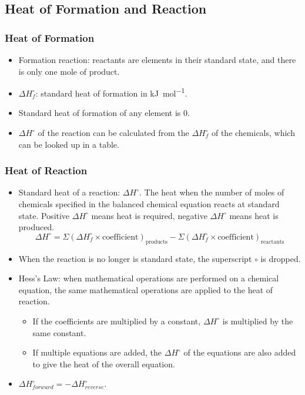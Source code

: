 \documentclass{article}
\begin{document}
\subsection{Heat of Formation and Reaction}

\subsubsection{Heat of Formation}

\begin{itemize}
    \item Formation reaction: reactants are elements in their standard state, and there is only one mole of product.
    \item $\Delta H_{f}^\circ$: standard heat of formation in \si[per-mode = fraction]{\kilo\joule\per\mole}. 
    \item Standard heat of formation of any element is $0$. 
    \item $\Delta H^\circ$ of the reaction can be calculated from the $\Delta H_{f}^\circ$ of the chemicals, which can be looked up in a table.
\end{itemize}

\subsubsection{Heat of Reaction}

\begin{itemize}
    \item Standard heat of a reaction: $\Delta H^\circ$. The heat when the number of moles of chemicals specified in the balanced chemical equation reacts at standard state. Positive $\Delta H^\circ$ means heat is required, negative $\Delta H^\circ$ means heat is produced.
    \begin{equation*}
        \Delta H^\circ = \Sigma (\Delta H_f^\circ \times \text{coefficient})_{\text{products}} - \Sigma (\Delta H_f^\circ \times \text{coefficient})_{\text{reactants}}
    \end{equation*}
    \item When the reaction is no longer is standard state, the superscript $\circ$ is dropped.
    \item Hess's Law: when mathematical operations are performed on a chemical equation, the same mathematical operations are applied to the heat of reaction.
    \begin{itemize}
        \item If the coefficients are multiplied by a constant, $\Delta H^\circ$ is multiplied by the same constant.
        \item If multiple equations are added, the $\Delta H^\circ$ of the equations are also added to give the heat of the overall equation.
    \end{itemize}
    \item $\Delta H_{forward}^\circ = -\Delta H_{reverse}^\circ$.
\end{itemize}
\end{document}
